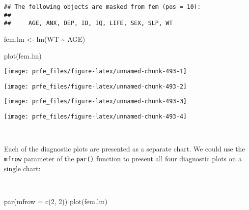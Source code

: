 \documentclass[
  12pt,
  a4paper]{book}
\newenvironment{Shaded}{\begin{snugshade}}{\end{snugshade}}
\newcommand{\AttributeTok}[1]{\textcolor[rgb]{0.77,0.63,0.00}{#1}}
\newcommand{\DecValTok}[1]{\textcolor[rgb]{0.00,0.00,0.81}{#1}}
\newcommand{\FunctionTok}[1]{\textcolor[rgb]{0.00,0.00,0.00}{#1}}
\newcommand{\NormalTok}[1]{#1}
\newcommand{\OtherTok}[1]{\textcolor[rgb]{0.56,0.35,0.01}{#1}}
\newcommand{\SpecialCharTok}[1]{\textcolor[rgb]{0.00,0.00,0.00}{#1}}
\begin{document}
\begin{verbatim}
## The following objects are masked from fem (pos = 10):
## 
##     AGE, ANX, DEP, ID, IQ, LIFE, SEX, SLP, WT
\end{verbatim}

\begin{Shaded}
\begin{Highlighting}[]
\NormalTok{fem.lm }\OtherTok{\textless{}{-}} \FunctionTok{lm}\NormalTok{(WT }\SpecialCharTok{\textasciitilde{}}\NormalTok{ AGE)}
\end{Highlighting}
\end{Shaded}

\newpage

\begin{Shaded}
\begin{Highlighting}[]
\FunctionTok{plot}\NormalTok{(fem.lm)}
\end{Highlighting}
\end{Shaded}

\begin{center}\texttt{[image: prfe\_files/figure-latex/unnamed-chunk-493-1]} \end{center}

\begin{center}\texttt{[image: prfe\_files/figure-latex/unnamed-chunk-493-2]} \end{center}

\begin{center}\texttt{[image: prfe\_files/figure-latex/unnamed-chunk-493-3]} \end{center}

\begin{center}\texttt{[image: prfe\_files/figure-latex/unnamed-chunk-493-4]} \end{center}

~

Each of the diagnostic plots are presented as a separate chart. We could use the \texttt{mfrow} parameter of the \texttt{par()} function to present all four diagnostic plots on a single chart:

~

\begin{Shaded}
\begin{Highlighting}[]
\FunctionTok{par}\NormalTok{(}\AttributeTok{mfrow =} \FunctionTok{c}\NormalTok{(}\DecValTok{2}\NormalTok{, }\DecValTok{2}\NormalTok{))}
\FunctionTok{plot}\NormalTok{(fem.lm)}
\end{Highlighting}
\end{Shaded}
\end{document}
